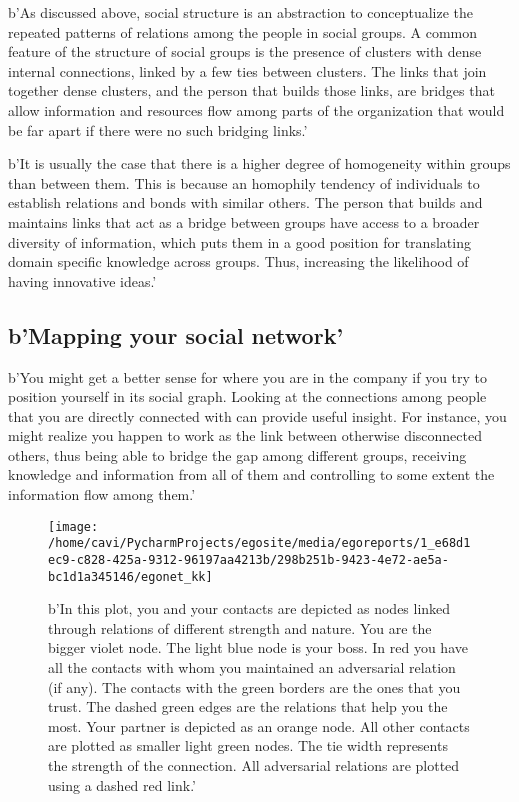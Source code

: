 \documentclass[a4paper,12pt]{article}
\begin{document}
b'As discussed above, social structure is an abstraction to conceptualize the repeated patterns of relations among the people in social groups. A common feature of the structure of social groups is the presence of clusters with dense internal connections, linked by a few ties between clusters. The links that join together dense clusters, and the person that builds those links, are bridges that allow information and resources flow among parts of the organization that would be far apart if there were no such bridging links.'

b'It is usually the case that there is a higher degree of homogeneity within groups than between them. This is because an homophily tendency of individuals to establish relations and bonds with similar others. The person that builds and maintains links that act as a bridge between groups have access to a broader diversity of information, which puts them in a good position for translating domain specific knowledge across groups. Thus, increasing the likelihood of having innovative ideas.'


\newpage


\subsection*{b'Mapping your social network'}


b'You might get a better sense for where you are in the company if you try to position yourself in its social graph. Looking at the connections among people that you are directly connected with can provide useful insight. For instance, you might realize you happen to work as the link between otherwise disconnected others, thus being able to bridge the gap among different groups, receiving knowledge and information from all of them and controlling to some extent the information flow among them.'


\begin{figure}[H]
\centering
\texttt{[image: /home/cavi/PycharmProjects/egosite/media/egoreports/1\_e68d1ec9-c828-425a-9312-96197aa4213b/298b251b-9423-4e72-ae5a-bc1d1a345146/egonet\_kk]}
\caption{b'In this plot, you and your contacts are depicted as nodes linked through relations of different strength and nature. You are the bigger violet node. The light blue node is your boss. In red you have all the contacts with whom you maintained an adversarial relation (if any). The contacts with the green borders are the ones that you trust. The dashed green edges are the relations that help you the most. Your partner is depicted as an orange node. All other contacts are plotted as smaller light green nodes. The tie width represents the strength of the connection. All adversarial relations are plotted using a dashed red link.'}
\end{figure}
\end{document}
